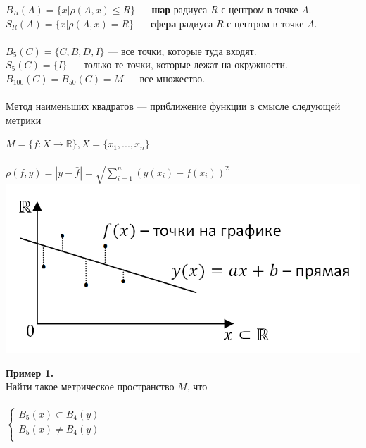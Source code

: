 \documentclass[12pt]{article}
\theoremstyle{definition}
\numberwithin{equation}{section}
\begin{document}
$B_R(A) = \{x | \rho(A, x) \leqslant R \}$ --- \textbf{шар} радиуса $R$ с центром в точке $A$.\\ 
$S_R(A) = \{x | \rho(A, x) = R \}$ --- \textbf{сфера} радиуса $R$ с центром в точке $A$.\\ 
\\
$B_5(C) = \{ C, B, D, I \}$ --- все точки, которые туда входят. \\
$S_5(C) = \{ I \}$ --- только те точки, которые лежат на окружности. \\
$B_{100}(C) = B_{50} (C) = M $ --- все множество. \\
\\
Метод наименьших квадратов --- приближение функции в смысле следующей метрики \begin{center} $M = \{f: X \rightarrow \mathbb{R} \}, X = \{ x_1, ..., x_n \}$\\ ~\\
$\rho (f, y) = |\bar y - \bar f| = \sqrt{\sum\limits_{i=1}^n(y(x_i)-f(x_i))^2}$ \\
\includegraphics[scale=0.6]{l4_4.png}\end{center}
\noindent \textbf{Пример 1.}\\
Найти такое метрическое пространство $M$, что\\ \\
$  
\left\{  
\begin{array}{lcl}  
    B_5(x) \subset B_4(y) \\  
    B_5(x) \neq B_4(y)\\
\end{array}   
\right.  
$
\end{document}
